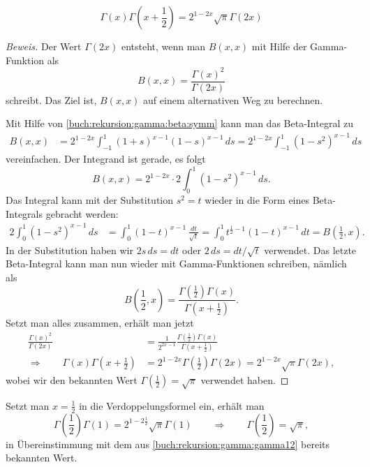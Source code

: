 \begin{satz}[Legendre]
\[
\Gamma(x)\Gamma(x+{\textstyle\frac12})
=
2^{1-2x}\sqrt{\pi}
\Gamma(2x)
\]
\end{satz}

\begin{proof}[Beweis]
Der Wert $\Gamma(2x)$ entsteht, wenn man $B(x,x)$ mit Hilfe der
Gamma-Funktion als
\[
B(x,x)
=
\frac{\Gamma(x)^2}{\Gamma(2x)}
\]
schreibt.
Das Ziel ist, $B(x,x)$ auf einem alternativen Weg zu berechnen.

Mit Hilfe von \eqref{buch:rekursion:gamma:beta:symm}
kann man das Beta-Integral zu
\begin{align*}
B(x,x)
&=
2^{1-2x}
\int_{-1}^1
(1+s)^{x-1}(1-s)^{x-1}
\,ds
=
2^{1-2x}
\int_{-1}^1(1-s^2)^{x-1}\,ds
\end{align*}
vereinfachen.
Der Integrand ist gerade, es folgt
\[
B(x,x)
=
2^{1-2x}
\cdot 2
\int_0^1(1-s^2)^{x-1}\,ds.
\]
Das Integral kann mit der Substitution $s^2=t$ wieder in die Form
eines Beta-Integrals gebracht werden:
\begin{align*}
2\int_0^1(1-s^2)^{x-1}\,ds
&=
\int_0^1 (1-t)^{x-1} \,\frac{dt}{\sqrt{t}}
=
\int_0^1 t^{\frac12-1}(1-t)^{x-1}\,dt
=
B({\textstyle\frac12},x).
\end{align*}
In der Substitution haben wir $2s\,ds = dt$ oder $2\,ds = dt/\sqrt{t}$
verwendet.
Das letzte Beta-Integral kann man nun wieder mit Gamma-Funktionen
schreiben, nämlich als
\[
B({\textstyle\frac12},x)
=
\frac{\Gamma({\textstyle\frac12})\Gamma(x)}{\Gamma(x+{\textstyle\frac12})}.
\]
Setzt man alles zusammen, erhält man jetzt
\begin{align*}
\frac{\Gamma(x)^2}{\Gamma(2x)}
&=
\frac1{2^{2x-1}}
\frac{\Gamma({\textstyle\frac12})\Gamma(x)}{\Gamma(x+{\textstyle\frac12})}
\\
\Rightarrow\qquad
\Gamma(x)\Gamma(x+{\textstyle\frac12})
&=
2^{1-2x}
\Gamma({\textstyle\frac12})\Gamma(2x)
=
2^{1-2x}\sqrt{\pi}\Gamma(2x),
\end{align*}
wobei wir den bekannten Wert $\Gamma(\frac12)=\sqrt{\pi}$ verwendet haben.
\end{proof}

Setzt man $x=\frac12$ in die Verdoppelungsformel ein, erhält man
\[
\Gamma({\textstyle\frac12})\Gamma(1) = 2^{1-2\frac12}\sqrt{\pi}\Gamma(1)
\qquad\Rightarrow\qquad
\Gamma({\textstyle\frac12}) = \sqrt{\pi},
\]
in Übereinstimmung mit dem aus \eqref{buch:rekursion:gamma:gamma12}
bereits bekannten Wert.

